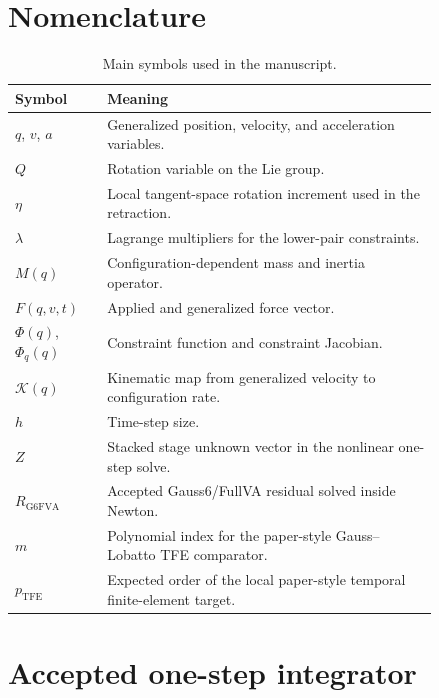 \documentclass[preprint,12pt]{elsarticle}
\newcommand{\method}{Gauss6\slash FullVA}
\newcommand{\tfe}{TFE}
\begin{document}
\section{Nomenclature}

\begin{table}[htbp]
\centering
\caption{Main symbols used in the manuscript.}
\label{tab:nomenclature}
\begin{tabular}{P{0.18\linewidth}P{0.66\linewidth}}
\toprule
Symbol & Meaning \\
\midrule
$q$, $v$, $a$ & Generalized position, velocity, and acceleration variables. \\
$Q$ & Rotation variable on the Lie group. \\
$\eta$ & Local tangent-space rotation increment used in the retraction. \\
$\lambda$ & Lagrange multipliers for the lower-pair constraints. \\
$M(q)$ & Configuration-dependent mass and inertia operator. \\
$F(q,v,t)$ & Applied and generalized force vector. \\
$\Phi(q)$, $\Phi_q(q)$ & Constraint function and constraint Jacobian. \\
$\mathcal{K}(q)$ & Kinematic map from generalized velocity to configuration rate. \\
$h$ & Time-step size. \\
$Z$ & Stacked stage unknown vector in the nonlinear one-step solve. \\
$R_{\mathrm{G6FVA}}$ & Accepted \method{} residual solved inside Newton. \\
$m$ & Polynomial index for the paper-style Gauss--Lobatto \tfe{} comparator. \\
$p_{\mathrm{TFE}}$ & Expected order of the local paper-style temporal finite-element target. \\
\bottomrule
\end{tabular}
\vspace{-3pt}
\end{table}

\section{Accepted one-step integrator}
\label{sec:method}
\end{document}
